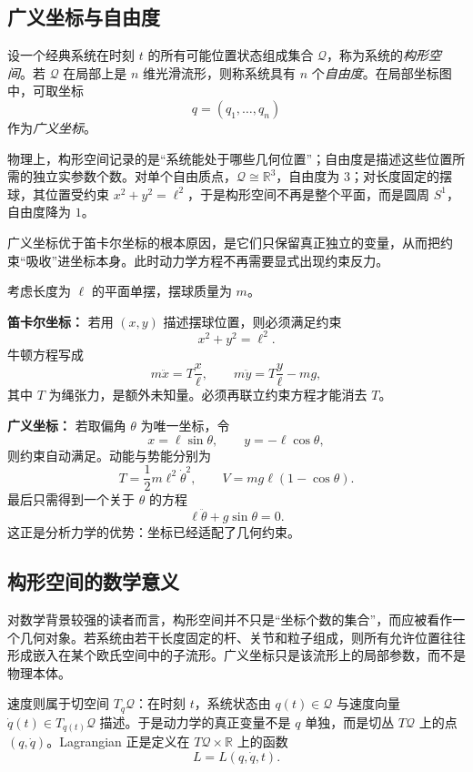 \subsection{广义坐标与自由度}

\begin{definition}[构形空间与自由度]
设一个经典系统在时刻 $t$ 的所有可能位置状态组成集合 $\mathcal Q$，称为系统的\emph{构形空间}。若 $\mathcal Q$ 在局部上是 $n$ 维光滑流形，则称系统具有 $n$ 个\emph{自由度}。在局部坐标图中，可取坐标
\[
  q=(q_1,\dots,q_n)
\]
作为\emph{广义坐标}。
\end{definition}

物理上，构形空间记录的是“系统能处于哪些几何位置”；自由度是描述这些位置所需的独立实参数个数。对单个自由质点，$\mathcal Q\cong \mathbb R^3$，自由度为 $3$；对长度固定的摆球，其位置受约束 $x^2+y^2=\ell^2$，于是构形空间不再是整个平面，而是圆周 $S^1$，自由度降为 $1$。

广义坐标优于笛卡尔坐标的根本原因，是它们只保留真正独立的变量，从而把约束“吸收”进坐标本身。此时动力学方程不再需要显式出现约束反力。

\begin{example}[平面单摆的两种描述]
考虑长度为 $\ell$ 的平面单摆，摆球质量为 $m$。

\textbf{笛卡尔坐标：} 若用 $(x,y)$ 描述摆球位置，则必须满足约束
\[
  x^2+y^2=\ell^2.
\]
牛顿方程写成
\[
  m\ddot x = T\frac{x}{\ell},\qquad m\ddot y = T\frac{y}{\ell}-mg,
\]
其中 $T$ 为绳张力，是额外未知量。必须再联立约束方程才能消去 $T$。

\textbf{广义坐标：} 若取偏角 $\theta$ 为唯一坐标，令
\[
  x=\ell\sin\theta,
  \qquad
  y=-\ell\cos\theta,
\]
则约束自动满足。动能与势能分别为
\[
  T=\frac12 m\ell^2\dot\theta^2,
  \qquad
  V=mg\ell(1-\cos\theta).
\]
最后只需得到一个关于 $\theta$ 的方程
\[
  \ell\ddot\theta + g\sin\theta =0.
\]
这正是分析力学的优势：坐标已经适配了几何约束。
\end{example}

\subsection{构形空间的数学意义}

对数学背景较强的读者而言，构形空间并不只是“坐标个数的集合”，而应被看作一个几何对象。若系统由若干长度固定的杆、关节和粒子组成，则所有允许位置往往形成嵌入在某个欧氏空间中的子流形。广义坐标只是该流形上的局部参数，而不是物理本体。

速度则属于切空间 $T_q\mathcal Q$：在时刻 $t$，系统状态由 $q(t)\in \mathcal Q$ 与速度向量 $\dot q(t)\in T_{q(t)}\mathcal Q$ 描述。于是动力学的真正变量不是 $q$ 单独，而是切丛 $T\mathcal Q$ 上的点 $(q,\dot q)$。Lagrangian 正是定义在 $T\mathcal Q\times \mathbb R$ 上的函数
\[
  L=L(q,\dot q,t).
\]

